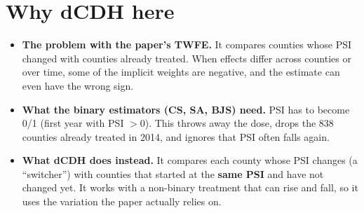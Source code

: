 \documentclass[11pt]{article}
\begin{document}
\section{Why dCDH here}
\begin{itemize}[leftmargin=14pt,itemsep=2pt]
\item \textbf{The problem with the paper's TWFE.} It compares counties whose PSI changed with counties already treated. When effects differ across counties or over time, some of the implicit weights are negative, and the estimate can even have the wrong sign.
\item \textbf{What the binary estimators (CS, SA, BJS) need.} PSI has to become 0/1 (first year with PSI $>0$). This throws away the dose, drops the 838 counties already treated in 2014, and ignores that PSI often falls again.
\item \textbf{What dCDH does instead.} It compares each county whose PSI changes (a ``switcher'') with counties that started at the \textbf{same PSI} and have not changed yet. It works with a non-binary treatment that can rise and fall, so it uses the variation the paper actually relies on.
\end{itemize}
\end{document}
